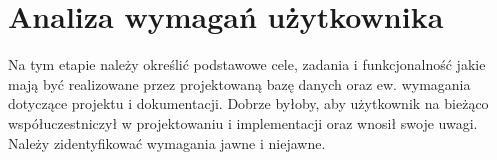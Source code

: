 \section{Analiza wymagań użytkownika}
Na tym etapie należy określić podstawowe
cele, zadania i funkcjonalność jakie mają być realizowane przez projektowaną bazę danych
oraz ew. wymagania dotyczące projektu i dokumentacji. Dobrze byłoby, aby użytkownik
na bieżąco współuczestniczył w projektowaniu i implementacji oraz wnosił swoje uwagi.
Należy zidentyfikować wymagania jawne i niejawne.